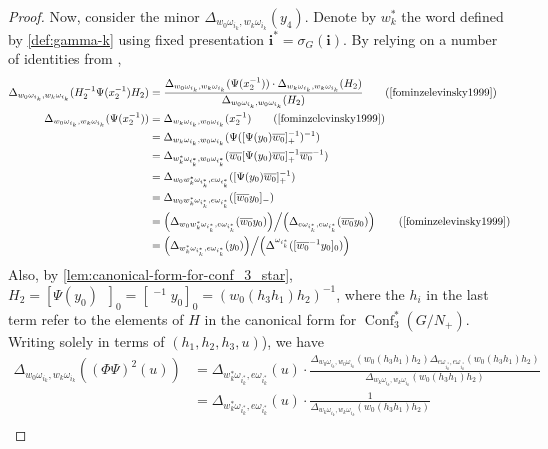 \documentclass{amsart}
\theoremstyle{plain}
\theoremstyle{definition}
\theoremstyle{remark}
\newcommand{\fundamentalweight}{\omega}
\newcommand{\genminor}[2]{\Delta^{{#1} \fundamentalweight_{#2}}}
\newcommand{\genminoryz}[3]{\Delta_{{#1} \fundamentalweight_{#3}, {#2}%
    \fundamentalweight_{#3}}}
\newcommand{\lifttoG}[1]{{\mathop{\overline{#1}}}}
\newcommand{\word}[1]{\mathbf{#1}}
\DeclareMathOperator{\Conf}{Conf}
\begin{document}
\begin{proof}
    Now, consider the minor $\genminoryz{w_0}{w_k}{i_k}(y_4)$. Denote by
    $w_k^{\ast}$ the word defined by \cref{def:gamma-k} using fixed
    presentation $\word{i}^{\ast} = \sigma_G(\word{i})$. By relying on a
    number of identities from \cite{fominzelevinsky1999},
    \begin{align*}
      \genminoryz{w_0}{w_k}{i_k}(H_2^{-1} \Psi(x_2^{-1}) H_2) &= \frac{\genminoryz{w_0}{w_k}{i_k}(\Psi(x_2^{-1})) \cdot \genminoryz{w_k}{w_k}{i_k}(H_2)}{\genminoryz{w_0}{w_0}{i_k}(H_2)} \tag{\cite[Equation~2.14]{fominzelevinsky1999}} \\
      \genminoryz{w_0}{w_k}{i_k}(\Psi(x_2^{-1})) &= \genminoryz{w_k}{w_0}{i_k}(x_2^{-1}) \tag{\cite[Equation~2.25]{fominzelevinsky1999}} \\
      &= \genminoryz{w_k}{w_0}{i_k}( \Psi([\Psi(y_0)\lifttoG{w_0} ]_{+}^{-1})^{-1} ) \\
      &= \genminoryz{w_k^{\ast}}{w_0}{i_k^{\ast}}( \lifttoG{w_0} [\Psi(y_0)\lifttoG{w_0} ]_{+}^{-1} \lifttoG{w_0}^{-1} ) \\
      &= \genminoryz{w_0w_k^{\ast}}{e}{i_k^{\ast}}( [\Psi(y_0)\lifttoG{w_0} ]_{+}^{-1} ) \\
      &= \genminoryz{w_0w_k^{\ast}}{e}{i_k^{\ast}}( [\lifttoG{w_0} y_0]_{-} ) \\
      &= \left(\genminoryz{w_0w_k^{\ast}}{e}{i_k^{\ast}}( \lifttoG{w_0} y_0 )\middle) \middle/ \middle(\genminoryz{e}{e}{i_k^{\ast}}(\lifttoG{w_0} y_0) \right) \tag{\cite[Equation~2.23]{fominzelevinsky1999}} \\
      &= \left(\genminoryz{w_k^{\ast}}{e}{i_k^{\ast}}( y_0 ) \middle) \middle/ \middle( \genminor{}{i_k^{\ast}}([\lifttoG{w_0}^{-1} y_0]_{0}) \right)
    \end{align*}
    Also, by \cref{lem:canonical-form-for-conf_3_star}, $H_2 =
    [\Psi(y_0) \lifttoG{w_0}]_{0} = [\lifttoG{w_0}^{-1} y_0]_{0} =
    (w_0(h_3 h_1) h_2)^{-1}$, where the $h_i$ in the last term refer to
    the elements of $H$ in the canonical form for
    $\Conf_{3}^{\ast}(G/N_{+})$. Writing solely in terms of $(h_1, h_2,
    h_3, u)$), we have
    \begin{align*}
      \genminoryz{w_0}{w_k}{i_k}((\Phi \Psi)^2(u)) &= \genminoryz{w_k^{\ast}}{e}{i_k^{\ast}}(u) \cdot \frac{ \genminoryz{w_0}{w_0}{i_k}( w_0(h_3 h_1)h_2 ) \genminoryz{e}{e}{i_k^{\ast}}( w_0(h_3 h_1)h_2 ) }{ \genminoryz{w_k}{w_k}{i_k}( w_0(h_3 h_1) h_2 ) } \\
      &= \genminoryz{w_k^{\ast}}{e}{i_k^{\ast}}(u) \cdot \frac{ 1 }{ \genminoryz{w_k}{w_k}{i_k}( w_0(h_3 h_1) h_2 ) } \\

\end{align*}
\end{proof}
\end{document}
